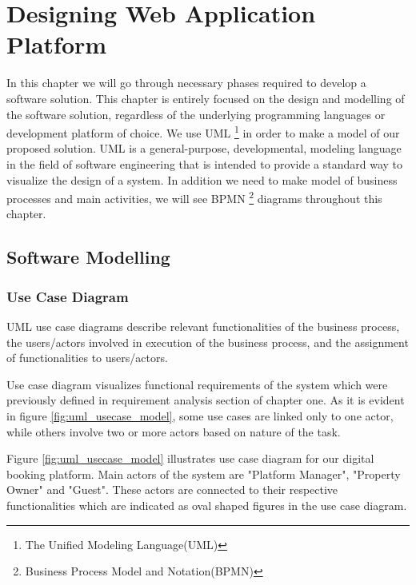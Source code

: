 \chapter{Designing Web Application Platform}
\label{chapter4}
\thispagestyle{plain}
In this chapter we will go through necessary phases required to develop a software solution. This chapter is entirely focused on the design and modelling of the software solution, regardless of the underlying programming languages or development platform of choice. We use UML \footnote{The Unified Modeling Language(UML)} in order to make a model of our proposed solution.
UML is a general-purpose, developmental, modeling language in the field of software engineering that is intended to provide a standard way to visualize the design of a system. In addition we need to make model of business processes and main activities, we will see BPMN \footnote{Business Process Model and Notation(BPMN)} diagrams throughout this chapter. 

\section{Software Modelling}
\subsection{Use Case Diagram}
UML use case diagrams describe relevant functionalities of the business process, the users/actors involved in execution of the business process, and the assignment of functionalities to users/actors.

Use case diagram visualizes functional requirements of the system which were previously defined in requirement analysis section of chapter one. As it is evident in figure \ref{fig:uml_usecase_model},  some use cases are linked only to one actor, while others involve two or more actors based on nature of the task.

Figure \ref{fig:uml_usecase_model} illustrates use case diagram for our digital booking platform. Main actors of the system are "Platform Manager", "Property Owner" and "Guest". These actors are connected to their respective functionalities which are indicated as oval shaped figures in the use case diagram.

